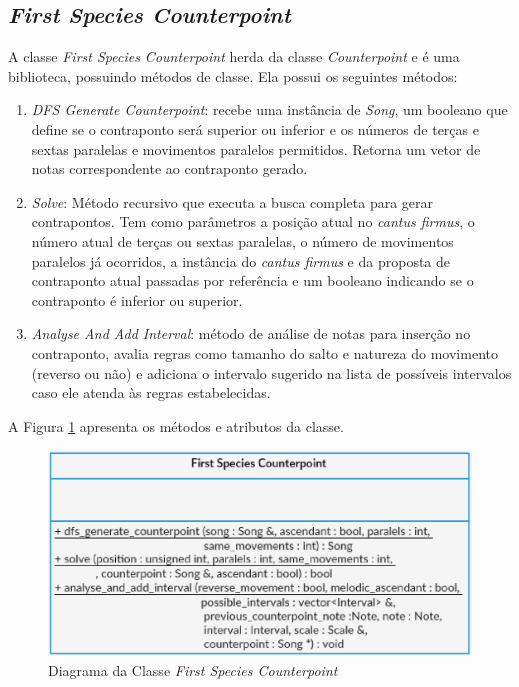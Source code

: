     \subsection[\textit{First Species Counterpoint}]{\textit{First Species Counterpoint}} \label{ssec:fec}

      A classe \textit{First Species Counterpoint} herda da classe \textit{Counterpoint} e é uma biblioteca, possuindo métodos de classe. Ela possui os seguintes métodos:

      \begin{enumerate}
        \item \textit{DFS Generate Counterpoint}: recebe uma instância de \textit{Song}, um booleano que define se o contraponto será superior ou inferior e os números de terças e sextas paralelas e movimentos paralelos permitidos. Retorna um vetor de notas correspondente ao contraponto gerado.
        \item \textit{Solve}: Método recursivo que executa a busca completa para gerar contrapontos. Tem como parâmetros a posição atual no \textit{cantus firmus}, o número atual de terças ou sextas paralelas, o número de movimentos paralelos já ocorridos, a instância do \textit{cantus firmus} e da proposta de contraponto atual passadas por referência e um booleano indicando se o contraponto é inferior ou superior.
        \item \textit{Analyse And Add Interval}: método de análise de notas para inserção no contraponto, avalia regras como tamanho do salto e natureza do movimento (reverso ou não) e adiciona o intervalo sugerido na lista de possíveis intervalos caso ele atenda às regras estabelecidas.
      \end{enumerate}

      A Figura \ref{firstspeciescounterpointclass} apresenta os métodos e atributos da classe.

      \begin{figure}[htb]
        \centering
        \includegraphics[scale=0.7]{figuras/firstspeciescounterpointclass.eps}
        \caption{Diagrama da Classe \textit{First Species Counterpoint}}
        \label{firstspeciescounterpointclass}
      \end{figure}

